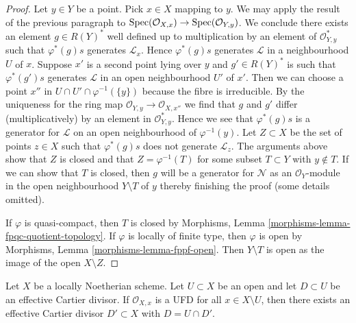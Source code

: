 \begin{proof}
\medskip\noindent
Let $y \in Y$ be a point.
Pick $x \in X$ mapping to $y$. We may apply the result of the previous
paragraph to $\mathop{\mathrm{Spec}}(\mathcal{O}_{X, x}) \to \mathop{\mathrm{Spec}}(\mathcal{O}_{Y, y})$.
We conclude there exists an element $g \in R(Y)^*$ well defined up to
multiplication by an element of $\mathcal{O}_{Y, y}^*$ such that
$\varphi^*(g)s$ generates $\mathcal{L}_x$. Hence $\varphi^*(g)s$
generates $\mathcal{L}$ in a neighbourhood $U$ of $x$.
Suppose $x'$ is a second point lying over $y$ and $g' \in R(Y)^*$ is
such that $\varphi^*(g')s$ generates $\mathcal{L}$ in an open neighbourhood
$U'$ of $x'$. Then we can choose a point
$x''$ in $U \cap U' \cap \varphi^{-1}(\{y\})$
because the fibre is irreducible. By the uniqueness for
the ring map $\mathcal{O}_{Y, y} \to \mathcal{O}_{X, x''}$
we find that $g$ and $g'$ differ (multiplicatively)
by an element in $\mathcal{O}_{Y, y}^*$. Hence we see that $\varphi^*(g)s$
is a generator for $\mathcal{L}$ on an open neighbourhood
of $\varphi^{-1}(y)$. Let $Z \subset X$ be the set of points
$z \in X$ such that $\varphi^*(g)s$ does not generate $\mathcal{L}_z$.
The arguments above show that $Z$ is closed and that $Z = \varphi^{-1}(T)$
for some subset $T \subset Y$ with $y \not \in T$. If we can show that
$T$ is closed, then $g$ will be a generator for $\mathcal{N}$ as an
$\mathcal{O}_Y$-module in the open neighbourhood $Y \setminus T$ of $y$
thereby finishing the proof (some details omitted).

\medskip\noindent
If $\varphi$ is quasi-compact, then $T$ is closed by
Morphisms, Lemma \ref{morphisms-lemma-fpqc-quotient-topology}.
If $\varphi$ is locally of finite type, then $\varphi$ is open
by Morphisms, Lemma \ref{morphisms-lemma-fppf-open}.
Then $Y \setminus T$ is open as the image of the open $X \setminus Z$.
\end{proof}

\begin{lemma}
\label{lemma-closure-effective-cartier-divisor}
Let $X$ be a locally Noetherian scheme. Let $U \subset X$ be
an open and let $D \subset U$ be an effective Cartier divisor.
If $\mathcal{O}_{X, x}$ is a UFD for all $x \in X \setminus U$,
then there exists an effective Cartier divisor $D' \subset X$
with $D = U \cap D'$.
\end{lemma}

